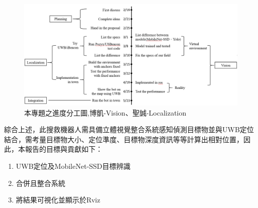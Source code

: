 \begin{figure}[tb]
	\includegraphics[width=1.8\columnwidth]{images/sys-architecture.png}
	\centering
	\caption{本專題之進度分工圖,博凱-Vision、聖誠-Localization}
	\label{figure:localization_sys_architecture}
\end{figure}

綜合上述，此搜救機器人需具備立體視覺整合系統感知偵測目標物並與UWB定位結合，需考量目標物大小、定位準度、目標物深度資訊等等計算出相對位置，因此，本報告的目標與貢獻如下：

\begin{enumerate}
\item
UWB定位及MobileNet-SSD目標辨識
\item 
合併且整合系統
\item 
將結果可視化並顯示於Rviz
\end{enumerate}







